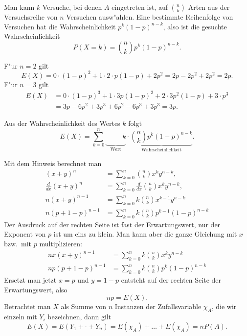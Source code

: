 \begin{loesung}
\begin{teilaufgaben}
\item
Man kann $k$ Versuche, bei denen $A$ eingetreten ist, auf
$\binom{n}{k}$ Arten aus der Versuchsreihe von $n$ Versuchen
ausw"ahlen. Eine bestimmte Reihenfolge von Versuchen hat die
Wahrscheinlichkeit $p^k(1-p)^{n-k}$, also ist die gesuchte
Wahrscheinlichkeit
\[
P(X=k)=\binom{n}{k}p^k(1-p)^{n-k}.
\]
\item
F"ur $n=2$ gilt
\[
E(X)=
0\cdot (1-p)^2+1\cdot 2\cdot p(1-p)+2p^2=2p-2p^2+2p^2=2p.
\]
F"ur $n=3$ gilt
\begin{align*}
E(X)&=0\cdot (1-p)^3+1\cdot 3p(1-p)^2+2\cdot 3p^2(1-p)+3\cdot p^3\\
&=3p-6p^2+3p^3+6p^2-6p^3+3p^3=3p.
\end{align*}
\item
Aus der Wahrscheinlichkeit des Wertes $k$ folgt
\[
E(X)=\sum_{k=0}^n\underbrace{\phantom{\binom{n}{k}}k}_{\text{Wert}}\cdot
\underbrace{\binom{n}{k}p^k(1-p)^{n-k}}_{\text{Wahrscheinlichkeit}}.
\]
\item Mit dem Hinweis berechnet man
\begin{align*}
(x+y)^n&=\sum_{k=0}^n\binom{n}{k}x^ky^{n-k},\\
\frac{d}{dx}
(x+y)^n&= \sum_{k=0}^n \frac{d}{dx} \binom{n}{k}x^ky^{n-k},\\
n(x+y)^{n-1}&=\sum_{k=0}^nk\binom{n}{k}x^{k-1}y^{n-k}\\
n(p+1-p)^{n-1}&=\sum_{k=0}^nk\binom{n}{k}p^{k-1}(1-p)^{n-k}
\end{align*}
Der Ausdruck auf der rechten Seite ist fast der Erwartungswert, nur
der Exponent von $p$ ist um eins zu klein. Man kann aber die ganze
Gleichung mit $x$ bzw.~mit $p$ multiplizieren:
\begin{align*}
nx(x+y)^{n-1}&=\sum_{k=0}^nk\binom{n}{k}x^ky^{n-k}\\
np(p+1-p)^{n-1}&=\sum_{k=0}^nk\binom{n}{k}p^k(1-p)^{n-k}
\end{align*}
Ersetzt man jetzt $x=p$ und $y=1-p$
entsteht auf der rechten
Seite der Erwartungswert, also
\[
np=E(X).
\]
Betrachtet man $X$ als Summe von $n$ Instanzen der Zufallsvariable
$\chi_A$, die wir einzeln mit $Y_i$ bezeichnen, dann gilt
\[
E(X)=E(Y_1+\cdot+Y_n)=E(\chi_A)+\dots +E(\chi_A)=nP(A).
\]
\end{teilaufgaben}
\end{loesung}

